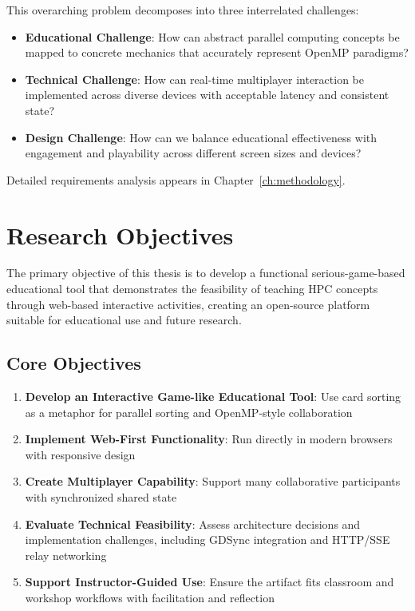 This overarching problem decomposes into three interrelated challenges:

\begin{itemize}
    \item \textbf{Educational Challenge}: How can abstract parallel computing concepts be mapped to concrete mechanics that accurately represent OpenMP paradigms?
    \item \textbf{Technical Challenge}: How can real-time multiplayer interaction be implemented across diverse devices with acceptable latency and consistent state?
    \item \textbf{Design Challenge}: How can we balance educational effectiveness with engagement and playability across different screen sizes and devices?
\end{itemize}

Detailed requirements analysis appears in Chapter~\ref{ch:methodology}.

\section{Research Objectives}
\label{sec:objectives}

The primary objective of this thesis is to develop a functional serious-game-based educational tool that demonstrates the feasibility of teaching HPC concepts through web-based interactive activities, creating an open-source platform suitable for educational use and future research.

\subsection{Core Objectives}
\label{subsec:core-objectives}

\begin{enumerate}
    \item \textbf{Develop an Interactive Game-like Educational Tool}: Use card sorting as a metaphor for parallel sorting and OpenMP-style collaboration
    \item \textbf{Implement Web-First Functionality}: Run directly in modern browsers with responsive design
    \item \textbf{Create Multiplayer Capability}: Support many collaborative participants with synchronized shared state
    \item \textbf{Evaluate Technical Feasibility}: Assess architecture decisions and implementation challenges, including GDSync integration and HTTP/SSE relay networking
    \item \textbf{Support Instructor-Guided Use}: Ensure the artifact fits classroom and workshop workflows with facilitation and reflection
\end{enumerate}

